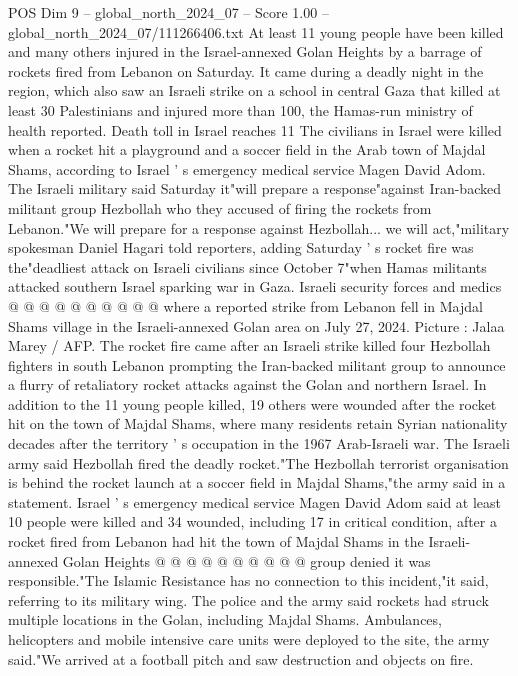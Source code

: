 \begin{textsample}{POS Dim 9 – global\_north\_2024\_07 – Score 1.00 – global\_north\_2024\_07/111266406.txt}  \label{ex:f9_pos_319}
At least 11 young people have been killed and many others injured in the Israel-annexed Golan Heights by a barrage of rockets fired from Lebanon on Saturday.
It came during a deadly night in the region, which also saw an Israeli strike on a school in central Gaza that killed at least 30 Palestinians and injured more than 100, the Hamas-run ministry of health reported.
Death toll in Israel reaches 11 The civilians in Israel were killed when a rocket hit a playground and a soccer field in the Arab town of Majdal Shams, according to Israel ' s emergency medical service Magen David Adom.
The Israeli military said Saturday it"will prepare a response"against Iran-backed militant group Hezbollah who they accused of firing the rockets from Lebanon."We will prepare for a response against Hezbollah... we will act,"military spokesman Daniel Hagari told reporters, adding Saturday ' s rocket fire was the"deadliest attack on Israeli civilians since October 7"when Hamas militants attacked southern Israel sparking war in Gaza.
Israeli security forces and medics @ @ @ @ @ @ @ @ @ @ where a reported strike from Lebanon fell in Majdal Shams village in the Israeli-annexed Golan area on July 27, 2024.
Picture : Jalaa Marey / AFP.
The rocket fire came after an Israeli strike killed four Hezbollah fighters in south Lebanon prompting the Iran-backed militant group to announce a flurry of retaliatory rocket attacks against the Golan and northern Israel.
In addition to the 11 young people killed, 19 others were wounded after the rocket hit on the town of Majdal Shams, where many residents retain Syrian nationality decades after the territory ' s occupation in the 1967 Arab-Israeli war.
The Israeli army said Hezbollah fired the deadly rocket."The Hezbollah terrorist organisation is behind the rocket launch at a soccer field in Majdal Shams,"the army said in a statement.
Israel ' s emergency medical service Magen David Adom said at least 10 people were killed and 34 wounded, including 17 in critical condition, after a rocket fired from Lebanon had hit the town of Majdal Shams in the Israeli-annexed Golan Heights @ @ @ @ @ @ @ @ @ @ group denied it was responsible."The Islamic Resistance has no connection to this incident,"it said, referring to its military wing.
The police and the army said rockets had struck multiple locations in the Golan, including Majdal Shams.
Ambulances, helicopters and mobile intensive care units were deployed to the site, the army said."We arrived at a football pitch and saw destruction and objects on fire.

\end{textsample}
